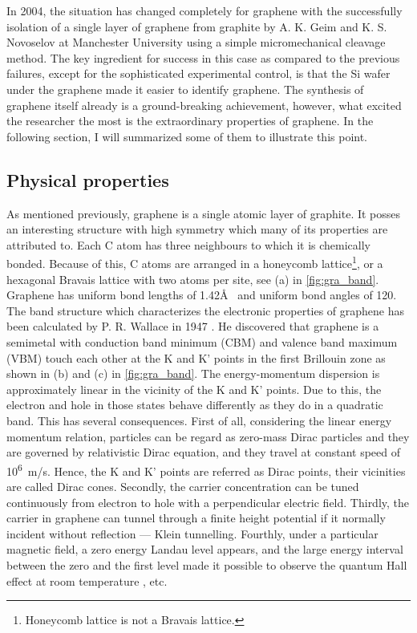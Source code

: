 In 2004, the situation has changed completely for graphene with the successfully isolation of a single layer of graphene from graphite by A. K. Geim and K. S. Novoselov at Manchester University using a simple micromechanical cleavage method. The key ingredient for success in this case as compared to the previous failures\cite{Krishnan1997,Ohashi1997}, except for the sophisticated experimental control, is that the Si wafer under the graphene made it easier to identify graphene\cite{Geim2007}. The synthesis of graphene itself already is a ground-breaking achievement, however, what excited the researcher the most is the extraordinary properties of graphene. In the following section, I will summarized some of them to illustrate this point.

\subsection{Physical properties}

As mentioned previously, graphene is a single atomic layer of graphite. It posses an interesting structure with high symmetry which many of its properties are attributed to. Each C atom has three neighbours to which it is chemically bonded. Because of this, C atoms are arranged in a honeycomb lattice\footnote{Honeycomb lattice is not a Bravais lattice.}, or a hexagonal Bravais lattice with two atoms per site, see (a) in \autoref{fig:gra_band}. Graphene has uniform bond lengths of 1.42\AA~ and uniform bond angles of 120\textdegree. The band structure which characterizes the electronic properties of graphene has been calculated by P. R. Wallace in 1947 \cite{Wallace1947}. He discovered that graphene is a semimetal with conduction band minimum (CBM) and valence band maximum (VBM) touch each other at the K and K' points in the first Brillouin zone as shown in (b) and (c) in \autoref{fig:gra_band}. The energy-momentum dispersion is approximately linear in the vicinity of the K and K' points. Due to this, the electron and hole in those states behave differently as they do in a quadratic band. This has several consequences. First of all, considering the linear energy momentum relation, particles can be regard as zero-mass Dirac particles and they are governed by relativistic Dirac equation\cite{Novoselov2005}, and they travel at constant speed of \si{10^6m/s}. Hence, the K and K' points are referred as Dirac points, their vicinities are called Dirac cones. Secondly, the carrier concentration can be tuned continuously from electron to hole with a perpendicular electric field\cite{Geim2007}. Thirdly, the carrier in graphene can tunnel through a finite height potential if it normally incident without reflection — Klein tunnelling\cite{Katsnelson2006}. Fourthly, under a particular magnetic field, a zero energy Landau level appears, and the large energy interval between the zero and the first level made it possible to observe the quantum Hall effect at room temperature \cite{Novoselov1379}, etc.

